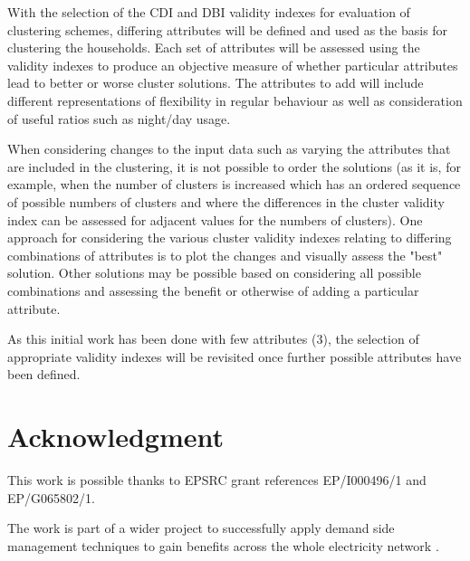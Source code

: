 \documentclass[conference]{IEEEtran}
\begin{document}
With the selection of the CDI and DBI validity indexes for evaluation of clustering schemes, differing attributes will be defined and used as the basis for clustering the households. Each set of attributes will be assessed using the validity indexes to produce an objective measure of whether particular attributes lead to better or worse cluster solutions. The attributes to add will include different representations of flexibility in regular behaviour as well as consideration of useful ratios such as night/day usage.

When considering changes to the input data such as varying the attributes that are included in the clustering, it is not possible to order the solutions (as it is, for example, when the number of clusters is increased which has an ordered sequence of possible numbers of clusters and where the differences in the cluster validity index can be assessed for adjacent values for the numbers of clusters). One approach for considering the various cluster validity indexes relating to differing combinations of attributes is to plot the changes and visually assess the "best" solution. Other solutions may be possible based on considering all possible combinations and assessing the benefit or otherwise of adding a particular attribute. 

As this initial work has been done with few attributes (3), the selection of appropriate validity indexes will be revisited once further possible attributes have been defined.




\section*{Acknowledgment}

This work is possible thanks to EPSRC grant references EP/I000496/1 and EP/G065802/1.

The work is part of a wider project to successfully apply demand side management techniques to gain benefits across the whole electricity network \cite{Kiprakis2011}.







\end{document}
